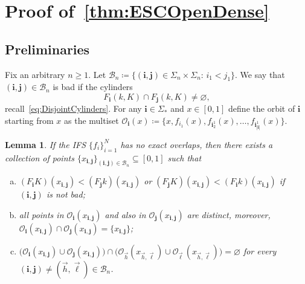 \documentclass[12pt,]{article}
\newtheorem{lemma}[theorem]{Lemma}
\theoremstyle{definition}
\theoremstyle{remark}
\newcommand{\0}{\mathbf{0}}
\newcommand{\bi}{\mathbf{i}}
\newcommand{\bj}{\mathbf{j}}
\begin{document}
{%
\section{Proof of~\cref{thm:ESCOpenDense}}\label{sec:ProofESCOpenDense}

\subsection{Preliminaries}

Fix an arbitrary $n\geq 1$. Let $\mathcal{B}_n\coloneqq\{(\bi,\bj)\in\Sigma_n\times\Sigma_n:\, i_1<j_1\}$. We say that $(\bi,\bj)\in\mathcal{B}_n$ is bad if the cylinders
\begin{equation}\label{eq:DefBad}
F_{\bi}(k,K)\cap F_{\bj}(k,K)\neq\varnothing,
\end{equation}
recall~\cref{eq:DisjointCylinders}. For any $\bi\in\Sigma_*$ and $x\in[0,1]$ define the orbit of $\bi$ starting from $x$ as the multiset $\mathcal{O}_{\bi}(x)\coloneqq \{x,f_{i_1}(x), f_{\bi_2^1}(x),\ldots,f_{\bi_{|\bi|}^1}(x)\}$. 


\begin{lemma}\label{lem:Pointsx_ij}
If the IFS $\{f_i\}_{i=1}^N$ has no exact overlaps, then there exists a collection of points $\{x_{\bi,\bj}\}_{(\bi,\bj)\in\mathcal{B}_n}\subseteq[0,1]$ such that
\begin{enumerate}[(a)]
\item $(F_{\bi}K)(x_{\bi,\bj}) < (F_{\bj}k)(x_{\bi,\bj})$ or $(F_{\bj}K)(x_{\bi,\bj}) < (F_{\bi}k)(x_{\bi,\bj})$ if $(\bi,\bj)$ is not bad;  
\item all points in $\mathcal{O}_{\bi}(x_{\bi,\bj})$ and also in $\mathcal{O}_{\bj}(x_{\bi,\bj})$ are distinct, moreover, $\mathcal{O}_{\bi}(x_{\bi,\bj})\cap\mathcal{O}_{\bj}(x_{\bi,\bj})=\{x_{\bi,\bj}\}$;
\item $\big(\mathcal{O}_{\bi}(x_{\bi,\bj})\cup \mathcal{O}_{\bj}(x_{\bi,\bj})\big) \cap \big(\mathcal{O}_{\vec{h}}(x_{\vec{h},\vec{\ell}})\cup \mathcal{O}_{\vec{\ell}}\,(x_{\vec{h},\vec{\ell}})\big)=\varnothing$ for every $(\bi,\bj)\neq (\vec{h},\vec{\ell})\in\mathcal{B}_n$.
\end{enumerate} 
\end{lemma}

}
\end{document}
